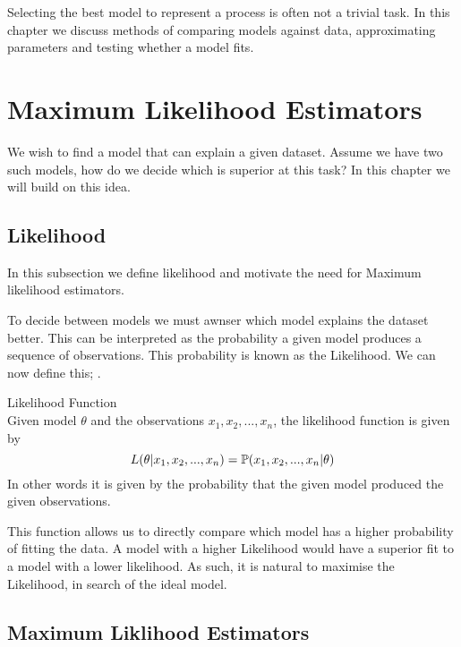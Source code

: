 
Selecting the best model to represent a process is often not a trivial task. In this chapter we discuss methods of comparing models against data, approximating parameters and testing whether a model fits. 

\section{Maximum Likelihood Estimators}
\label{Model_Selection:Maximum_Liklihood_Estimators}

We wish to find a model that can explain a given dataset. Assume we have two such models, how do we decide which is superior at this task? In this chapter we will build on this idea. 

    \subsection{Likelihood}
    \label{Model_Selection:Maximum_Liklihood_Estimators:Likelihood}

    In this subsection we define likelihood and motivate the need for Maximum likelihood estimators.

    To decide between models we must awnser which model explains the dataset better. This can be interpreted as the probability a given model produces a sequence of observations. This probability is known as the Likelihood. We can now define this; \cite{Ross2004}.

    \begin{definition} Likelihood Function \\
        Given model $\theta$ and the observations $x_1, x_2,...,x_n$, the likelihood function is given by
        \begin{equation}
            \label{Definition:Likelihood}
            L(\theta|x_1, x_2,...,x_n) = \mathbb{P}(x_1, x_2,...,x_n|\theta)
        \end{equation} 
        In other words it is given by the probability that the given model produced the given observations.
    \end{definition}

    This function allows us to directly compare which model has a higher probability of fitting the data. A model with a higher Likelihood would have a superior fit to a model with a lower likelihood. As such, it is natural to maximise the Likelihood, in search of the ideal model. 

    \subsection{Maximum Liklihood Estimators}
    \label{Model_Selection:Maximum_Liklihood_Estimators:MLE}

